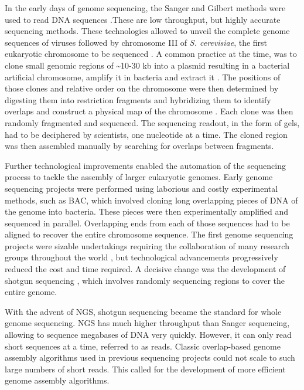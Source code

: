 In the early days of genome sequencing, the Sanger and Gilbert methods were used to read DNA sequences \cite{sangerDNASequencingChainterminating1977,maxamNewMethodSequencing1977}.These are low throughput, but highly accurate sequencing methods. These technologies allowed to unveil the complete genome sequences of viruses \citep{sangerNucleotideSequenceBacteriophage1982,baerDNASequenceExpression1984,vanwezenbeekNucleotideSequenceFilamentous1980} followed by chromosome III of \textit{S. cerevisiae}, the first eukaryotic chromosome to be sequenced \cite{oliverCompleteDNASequence1992}. A common practice at the time, was to clone small genomic regions of \textasciitilde 10-30 kb into a plasmid resulting in a bacterial artificial chromosome, amplify it in bacteria and extract it \cite{thierryCompleteSequenceKb1990}. The positions of those clones and relative order on the chromosome were then determined by digesting them into restriction fragments and hybridizing them to identify overlaps and construct a physical map of the chromosome \cite{mcphersonPhysicalMapHuman2001}. Each clone was then randomly fragmented and sequenced. The sequencing readout, in the form of gels, had to be deciphered by scientists, one nucleotide at a time. The cloned region was then assembled manually by searching for overlaps between fragments.

Further technological improvements enabled the automation of the sequencing process to tackle the assembly of larger eukaryotic genomes. Early genome sequencing projects were performed using laborious and costly experimental methods, such as \acrfull{BAC}, which involved cloning long overlapping pieces of DNA of the genome into bacteria. These pieces were then experimentally amplified and sequenced in parallel. Overlapping ends from each of those sequences had to be aligned to recover the entire chromosome sequence. The first genome sequencing projects were sizable undertakings requiring the collaboration of many research groups throughout the world \citep{collinsNewFiveyearPlan1993,adamsGenomeSequenceDrosophila2000,oliverCompleteDNASequence1992}, but technological advancements progressively reduced the cost and time required. A decisive change was the development of shotgun sequencing \cite{venterSequenceHumanGenome2001}, which involves randomly sequencing regions to cover the entire genome.

With the advent of \acrfull{NGS}, shotgun sequencing became the standard for whole genome sequencing. \acrshort{NGS} has much higher throughput than Sanger sequencing, allowing to sequence megabases of DNA very quickly. However, it can only read short sequences at a time, referred to as \Gls{read}s. Classic overlap-based genome assembly algorithms used in previous sequencing projects could not scale to such large numbers of short reads. This called for the development of more efficient genome assembly algorithms.

